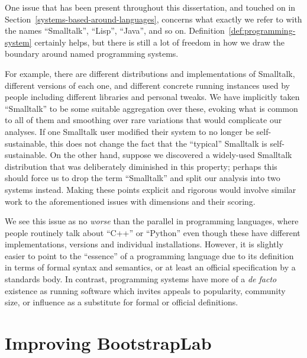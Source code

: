 \documentclass[ twoside,openright,titlepage,numbers=noenddot,headinclude,footinclude,cleardoublepage=empty,abstract=on,
                BCOR=5mm,paper=a4,fontsize=11pt
                ]{scrreprt}
\theoremstyle{definition}
\begin{document}
One issue that has been present throughout this dissertation, and
touched on in Section~\ref{systems-based-around-languages}, concerns
what exactly we refer to with the names ``Smalltalk'', ``Lisp'',
``Java'', and so on. Definition~\ref{def:programming-system} certainly
helps, but there is still a lot of freedom in how we draw the boundary
around named programming systems.

For example, there are different distributions and implementations of
Smalltalk, different versions of each one, and different concrete
running instances used by people including different libraries and
personal tweaks. We have implicitly taken ``Smalltalk'' to be some
suitable aggregation over these, evoking what is common to all of them
and smoothing over rare variations that would complicate our analyses.
If one Smalltalk user modified their system to no longer be
self-sustainable, this does not change the fact that the ``typical''
Smalltalk is self-sustainable. On the other hand, suppose we discovered
a widely-used Smalltalk distribution that was deliberately diminished in
this property; perhaps this should force us to drop the term
``Smalltalk'' and split our analysis into two systems instead. Making
these points explicit and rigorous would involve similar work to the
aforementioned issues with dimensions and their scoring.

We see this issue as no \emph{worse} than the parallel in programming
languages, where people routinely talk about ``C++'' or ``Python'' even
though these have different implementations, versions and individual
installations. However, it is slightly easier to point to the
``essence'' of a programming language due to its definition in terms of
formal syntax and semantics, or at least an official specification by a
standards body. In contrast, programming systems have more of a \emph{de
facto} existence as running software \parencite{PLrev} which invites
appeals to popularity, community size, or influence as a substitute for
formal or official definitions.

\hypertarget{improving-bootstraplab}{\section{Improving BootstrapLab}\label{improving-bootstraplab}}
\end{document}
